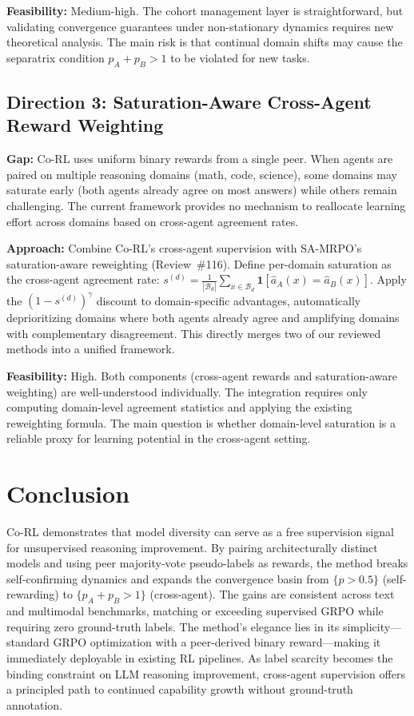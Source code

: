 \documentclass[11pt,a4paper]{article}
\begin{document}
\textbf{Feasibility:} Medium-high. The cohort management layer is straightforward, but validating convergence guarantees under non-stationary dynamics requires new theoretical analysis. The main risk is that continual domain shifts may cause the separatrix condition $p_A + p_B > 1$ to be violated for new tasks.

\subsection{Direction 3: Saturation-Aware Cross-Agent Reward Weighting}
\textbf{Gap:} Co-RL uses uniform binary rewards from a single peer. When agents are paired on multiple reasoning domains (math, code, science), some domains may saturate early (both agents already agree on most answers) while others remain challenging. The current framework provides no mechanism to reallocate learning effort across domains based on cross-agent agreement rates.

\textbf{Approach:} Combine Co-RL's cross-agent supervision with SA-MRPO's saturation-aware reweighting (Review~\#116). Define per-domain saturation as the cross-agent agreement rate: $s^{(d)} = \frac{1}{|\mathcal{B}_d|}\sum_{x \in \mathcal{B}_d} \mathbf{1}[\hat{a}_A(x) = \hat{a}_B(x)]$. Apply the $(1 - s^{(d)})^\gamma$ discount to domain-specific advantages, automatically deprioritizing domains where both agents already agree and amplifying domains with complementary disagreement. This directly merges two of our reviewed methods into a unified framework.

\textbf{Feasibility:} High. Both components (cross-agent rewards and saturation-aware weighting) are well-understood individually. The integration requires only computing domain-level agreement statistics and applying the existing reweighting formula. The main question is whether domain-level saturation is a reliable proxy for learning potential in the cross-agent setting.

\section{Conclusion}
Co-RL demonstrates that model diversity can serve as a free supervision signal for unsupervised reasoning improvement. By pairing architecturally distinct models and using peer majority-vote pseudo-labels as rewards, the method breaks self-confirming dynamics and expands the convergence basin from $\{p > 0.5\}$ (self-rewarding) to $\{p_A + p_B > 1\}$ (cross-agent). The gains are consistent across text and multimodal benchmarks, matching or exceeding supervised GRPO while requiring zero ground-truth labels. The method's elegance lies in its simplicity---standard GRPO optimization with a peer-derived binary reward---making it immediately deployable in existing RL pipelines. As label scarcity becomes the binding constraint on LLM reasoning improvement, cross-agent supervision offers a principled path to continued capability growth without ground-truth annotation.
\end{document}
